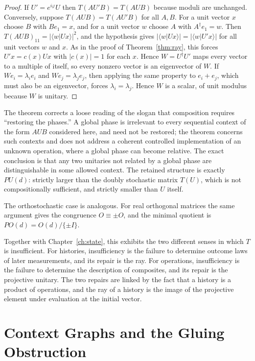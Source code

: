 \documentclass[11pt,oneside]{book}
\theoremstyle{definition}
\theoremstyle{remark}
\begin{document}
\begin{proof}
If $U'=e^{i\varphi}U$ then $T(AU'B)=T(AUB)$ because moduli are unchanged. Conversely, suppose $T(AUB)=T(AU'B)$ for all $A,B$. For a unit vector $x$ choose $B$ with $Be_1=x$, and for a unit vector $w$ choose $A$ with $A^{\dagger}e_1=w$. Then $T(AUB)_{11}=|\langle w|Ux\rangle|^2$, and the hypothesis gives $|\langle w|Ux\rangle|=|\langle w|U'x\rangle|$ for all unit vectors $w$ and $x$. As in the proof of Theorem~\ref{thm:ray}, this forces $U'x=c(x)Ux$ with $|c(x)|=1$ for each $x$. Hence $W=U^{\dagger}U'$ maps every vector to a multiple of itself, so every nonzero vector is an eigenvector of $W$. If $We_i=\lambda_ie_i$ and $We_j=\lambda_je_j$, then applying the same property to $e_i+e_j$, which must also be an eigenvector, forces $\lambda_i=\lambda_j$. Hence $W$ is a scalar, of unit modulus because $W$ is unitary.
\end{proof}

The theorem corrects a loose reading of the slogan that composition requires ``restoring the phases.'' A global phase is irrelevant to every sequential context of the form $AUB$ considered here, and need not be restored; the theorem concerns such contexts and does not address a coherent controlled implementation of an unknown operation, where a global phase can become relative. The exact conclusion is that any two unitaries not related by a global phase are distinguishable in some allowed context. The retained structure is exactly $PU(d)$: strictly larger than the doubly stochastic matrix $T(U)$, which is not compositionally sufficient, and strictly smaller than $U$ itself.

The orthostochastic case is analogous. For real orthogonal matrices the same argument gives the congruence $O\equiv\pm O$, and the minimal quotient is $PO(d)=O(d)/\{\pm I\}$.

Together with Chapter~\ref{ch:state}, this exhibits the two different senses in which $T$ is insufficient. For histories, insufficiency is the failure to determine outcome laws of later measurements, and its repair is the ray. For operations, insufficiency is the failure to determine the description of composites, and its repair is the projective unitary. The two repairs are linked by the fact that a history is a product of operations, and the ray of a history is the image of the projective element under evaluation at the initial vector.

\chapter{Context Graphs and the Gluing Obstruction}\label{ch:gluing}
\end{document}
